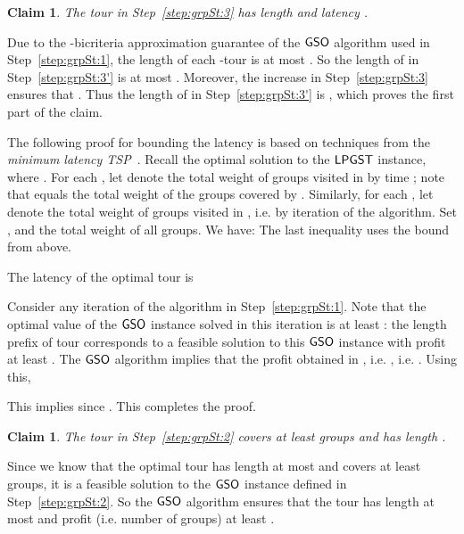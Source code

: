 \documentclass[11pt]{article}
\newtheorem{claim}[thm]{Claim}
\def\lpgst{\ensuremath{{\sf LPGST}}\xspace}
\def\gso{\ensuremath{{\sf GSO}}\xspace}
\newenvironment{pf}{

\noindent{\bf Proof:}} {\hfill


}
\begin{document}
\begin{claim}\label{cl:lat-gst-1}
  The tour  in Step~\ref{step:grpSt:3} has length
   and latency .
\end{claim}
\begin{pf}
Due to the -bicriteria approximation guarantee of the \gso algorithm used in Step~\ref{step:grpSt:1}, the length of each -tour  is at most . So the length of   in Step~\ref{step:grpSt:3'} is at most .
Moreover, the increase in Step~\ref{step:grpSt:3}
  ensures that . Thus the length of   in Step~\ref{step:grpSt:3'} is , which proves the first part of the claim. 
  
 
 
  The following proof for bounding the latency is based on techniques from
  the {\em minimum latency TSP}~\cite{cgrt,fhr}. Recall the optimal solution 
  to the \lpgst instance, where . For each , let  denote the total weight of
  groups visited in  by time ; note that 
  equals the total weight of the groups covered by .
  Similarly, for each , let  denote the total weight of
  groups visited in , i.e. by iteration 
  of the algorithm. Set , and  the
  total weight of all groups. We have: 
{\small   }
  The last inequality uses the bound  from above.
  
The latency of the optimal tour  is


  Consider any iteration  of the algorithm in
  Step~\ref{step:grpSt:1}. Note that the optimal value of the \gso
  instance solved in this iteration is at least : the
   length prefix of tour  corresponds to a feasible
  solution to this \gso instance with profit at least . The \gso algorithm implies
  that the profit obtained in , i.e.  , i.e. . Using this,
  
This implies 
since . This completes the proof.
\end{pf}

\begin{claim}\label{cl:lat-gst-2}
  The tour  in Step~\ref{step:grpSt:2} covers at least
   groups and has length .
\end{claim}
\begin{pf}
  Since we know that the optimal tour  has length at most
   and covers at least  groups, it is a feasible solution to
  the \gso instance defined in Step~\ref{step:grpSt:2}. So the \gso algorithm 
  ensures that the tour  has length at most  and profit (i.e. number of groups) at least . 
\end{pf}
\end{document}
